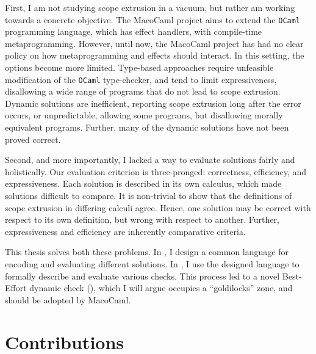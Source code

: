 First, I am not studying scope extrusion in a vacuum, but rather am working towards a concrete objective. The MacoCaml \citep{xie-2022} project aims to extend the \texttt{OCaml} programming language, which has effect handlers, with compile-time metaprogramming. However, until now, the MacoCaml project has had no clear policy on how metaprogramming and effects should interact. In this setting, the options become more limited. Type-based approaches require unfeasible modification of the \texttt{OCaml} type-checker, and tend to limit expressiveness, disallowing a wide range of programs that do not lead to scope extrusion. Dynamic solutions are inefficient, reporting scope extrusion long after the error occurs, or unpredictable, allowing some programs, but disallowing morally equivalent programs. Further, many of the dynamic solutions have not been proved correct.

Second, and more importantly, I lacked a way to evaluate solutions fairly and holistically. Our evaluation criterion is three-pronged: correctness, efficiency, and expressiveness. Each solution is described in its own calculus, which made solutions difficult to compare. It is non-trivial to show that the definitions of scope extrusion in differing calculi agree. Hence, one solution may be correct with respect to its own definition, but wrong with respect to another. Further, expressiveness and efficiency are inherently comparative criteria.

This thesis solves both these problems. In , I design a common language for encoding and evaluating different solutions. In , I use the designed language to formally describe and evaluate various checks. This process led to a novel Best-Effort dynamic check (), which I will argue occupies a ``goldilocks'' zone, and should be adopted by MacoCaml.

\section{Contributions}

